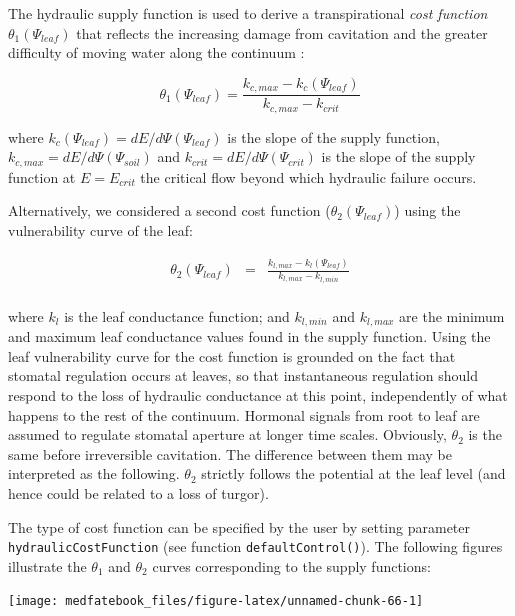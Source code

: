 \documentclass[]{book}
\begin{document}
The hydraulic supply function is used to derive a transpirational
\emph{cost function} \(\theta_1(\Psi_{leaf})\) that reflects the
increasing damage from cavitation and the greater difficulty of moving
water along the continuum \citep{Sperry2016a}:

\begin{equation}
\theta_1(\Psi_{leaf}) = \frac{k_{c,max}-k_{c}(\Psi_{leaf})}{k_{c,max}-k_{crit}}
\end{equation}

where \(k_c(\Psi_{leaf}) = dE/d\Psi(\Psi_{leaf})\) is the slope of the
supply function, \(k_{c,max} = dE/d\Psi(\Psi_{soil})\) and
\(k_{crit} = dE/d\Psi(\Psi_{crit})\) is the slope of the supply function
at \(E = E_{crit}\) the critical flow beyond which hydraulic failure
occurs.

Alternatively, we considered a second cost function
(\(\theta_2(\Psi_{leaf})\)) using the vulnerability curve of the leaf:

\begin{eqnarray}
\theta_2(\Psi_{leaf}) &=& \frac{k_{l, max}-k_l(\Psi_{leaf})}{k_{l,max} - k_{l,min}}\\
\end{eqnarray}

where \(k_l\) is the leaf conductance function; and \(k_{l,min}\) and
\(k_{l,max}\) are the minimum and maximum leaf conductance values found
in the supply function. Using the leaf vulnerability curve for the cost
function is grounded on the fact that stomatal regulation occurs at
leaves, so that instantaneous regulation should respond to the loss of
hydraulic conductance at this point, independently of what happens to
the rest of the continuum. Hormonal signals from root to leaf are
assumed to regulate stomatal aperture at longer time scales. Obviously,
\(\theta_2\) is the same before irreversible cavitation. The difference
between them may be interpreted as the following. \(\theta_2\) strictly
follows the potential at the leaf level (and hence could be related to a
loss of turgor).

The type of cost function can be specified by the user by setting
parameter \texttt{hydraulicCostFunction} (see function
\texttt{defaultControl()}). The following figures illustrate the
\(\theta_1\) and \(\theta_2\) curves corresponding to the supply
functions:

\begin{center}\texttt{[image: medfatebook\_files/figure-latex/unnamed-chunk-66-1]} \end{center}
\end{document}
